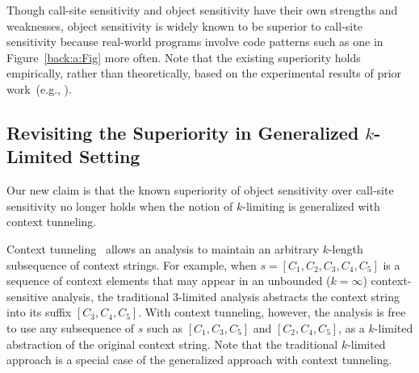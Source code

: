 


 Though call-site sensitivity and object sensitivity have their own
 strengths and weaknesses, object
  sensitivity is widely known to be superior to call-site sensitivity 
  because real-world programs involve code patterns such as one in
  Figure~\ref{back:a:Fig} more often. 
  Note that the existing superiority holds empirically, rather than theoretically, based on the experimental results of prior work~(e.g., \cite{Lhotak2008,BravenboerS09}).  
  



\subsection{Revisiting the Superiority in Generalized $k$-Limited Setting}\label{sec:overview-result}
Our new claim is that the known superiority of object sensitivity over call-site sensitivity no longer holds when the notion of $k$-limiting is generalized with context tunneling. 


Context tunneling~\cite{JeJeOh18} allows an analysis to maintain an arbitrary $k$-length subsequence of context strings.
For example, when $s = [C_1, C_2, C_3, C_4, C_5]$ is a sequence of
context elements that may appear in an unbounded ($k=\infty$)
context-sensitive analysis, the traditional $3$-limited analysis
abstracts the context string into its suffix $[C_3,C_4,C_5]$. 
With context tunneling, however, the analysis is free to use any
subsequence of $s$ such as $[C_1, C_3, C_5]$ and $[C_2, C_4, C_5]$, as
a $k$-limited abstraction of the original context string. 
Note that the traditional $k$-limited approach is a special case of the
generalized approach with context tunneling. 


